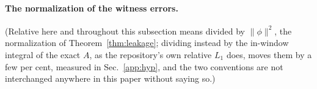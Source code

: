 \paragraph{The normalization of the witness errors.} (Relative here and throughout this subsection means divided by $\lVert\phi\rVert^{2}$, the normalization
of Theorem~\ref{thm:leakage}; dividing instead by the in-window integral of the exact $A$, as the
repository's own relative $L_1$ does, moves them by a few per cent, measured in Sec.~\ref{app:hyp}, and the two conventions are not interchanged
anywhere in this paper without saying so.)
